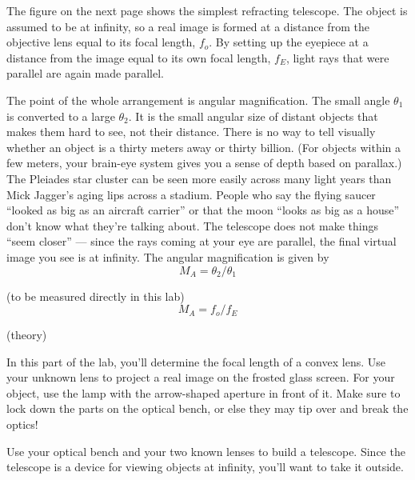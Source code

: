 \label{fig:telescope}

The figure on the next page
shows the simplest refracting telescope. The
object is assumed to be at infinity, so a real image is
formed at a distance from the objective lens equal to its
focal length, $f_o$. By setting up the eyepiece at a
distance from the image equal to its own focal length,
$f_E$, light rays that were parallel are again made parallel.

The point of the whole arrangement is angular magnification.
The small angle $\theta_1$ is converted to a large
$\theta_2$. It is the small angular size of distant objects
that makes them hard to see, not their distance. There is no
way to tell visually whether an object is a thirty meters
away or thirty billion. (For objects within a few meters,
your brain-eye system gives you a sense of depth based on
parallax.) The Pleiades star cluster can be seen more easily
across many light years than Mick Jagger's aging lips across
a stadium. People who say the flying saucer ``looked as big
as an aircraft carrier'' or that the moon ``looks as big as
a house'' don't know what they're talking about. The
telescope does not make things ``seem closer'' --- since the
rays coming at your eye are parallel, the final virtual
image you see is at infinity. The angular magnification is given by
\begin{equation*}
      M_A  =  \theta_2/\theta_1   
\end{equation*}

(to be measured directly in this lab)
\begin{equation*}
      M_A  =  f_o/f_E   
\end{equation*}

(theory)

\observations

In this part of the lab, you'll determine the focal length of a convex lens.
Use your unknown lens to project a real image on the
frosted glass screen. For your object, use the lamp with the
arrow-shaped aperture in front of it. Make sure to lock down
the parts on the optical bench, or else they may tip over
and break the optics!


Use your optical bench and your two known lenses to build a
telescope.
 Since the telescope is a device for viewing objects
at infinity, you'll want to take it outside.

